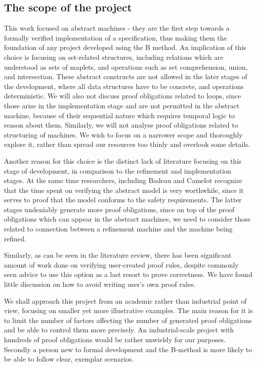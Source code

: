 \documentclass[11pt,journal]{IEEEtran}
\begin{document}
	\subsection{The scope of the project}
	This work focused on abstract machines - they are the first step towards a formally verified implementation of a specification, thus making them the foundation of any project developed using the B method. An implication of this choice is focusing on set-related structures, including relations which are understood as sets of maplets, and operations such as set comprehension, union, and intersection. These abstract constructs are not allowed in the later stages of the development, where all data structures have to be concrete, and operations deterministic. We will also not discuss proof obligations related to loops, since those arise in the implementation stage and are not permitted in the abstract machine, because of their sequential nature which requires temporal logic to reason about them. Similarly, we will not analyse proof obligations related to structuring of machines. We wish to focus on a narrower scope and thoroughly explore it, rather than spread our resources too thinly and overlook some details.
		
	Another reason for this choice is the distinct lack of literature focusing on this stage of development, in comparison to the refinement and implementation stages. At the same time researchers, including Badeau and Camelot recognize that the time spent on verifying the abstract model is very worthwhile, since it serves to proof that the model conforms to the safety requirements\cite{airport shuttle}. The latter stages undeniably generate more proof obligations, since on top of the proof obligations which can appear in the abstract machines, we need to consider those related to connection between a refinement machine and the machine being refined.
	
	Similarly, as can be seen in the literature review, there has been significant amount of work done on verifying user-created proof rules, despite commonly seen advice to use this option as a last resort to prove correctness. We have found little discussion on how to avoid writing user's own proof rules.
	
	We shall approach this project from an academic rather than industrial point of view, focusing on smaller yet more illustrative examples. The main reason for it is to limit the number of factors affecting the number of generated proof obligations and be able to control them more precisely. An industrial-scale project with hundreds of proof obligations would be rather unwieldy for our purposes. Secondly a person new to formal development and the B-method is more likely to be able to follow clear, exemplar scenarios. 
	
\end{document}
